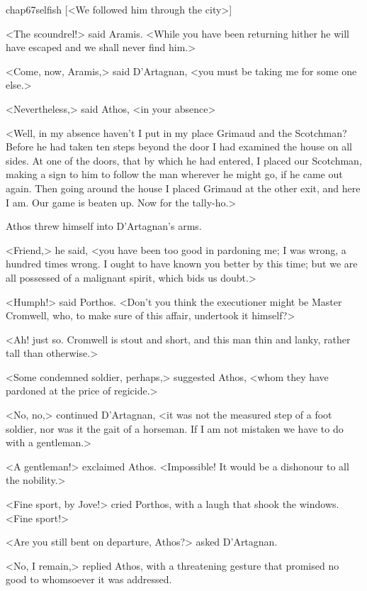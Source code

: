 \begin{bwbigpic}
	[\basicscale] 
	{chap67selfish}
	[<We followed him through the city>]
\end{bwbigpic}

<The scoundrel!> said Aramis. <While you have been returning hither he will have escaped and we shall never find him.>

<Come, now, Aramis,> said D'Artagnan, <you must be taking me for some one else.>

<Nevertheless,> said Athos, <in your absence\longdash>

<Well, in my absence haven't I put in my place Grimaud and the Scotchman? Before he had taken ten steps beyond the door I had examined the house on all sides. At one of the doors, that by which he had entered, I placed our Scotchman, making a sign to him to follow the man wherever he might go, if he came out again. Then going around the house I placed Grimaud at the other exit, and here I am. Our game is beaten up. Now for the tally-ho.>

Athos threw himself into D'Artagnan's arms.

<Friend,> he said, <you have been too good in pardoning me; I was wrong, a hundred times wrong. I ought to have known you better by this time; but we are all possessed of a malignant spirit, which bids us doubt.>

<Humph!> said Porthos. <Don't you think the executioner might be Master Cromwell, who, to make sure of this affair, undertook it himself?>

<Ah! just so. Cromwell is stout and short, and this man thin and lanky, rather tall than otherwise.>

<Some condemned soldier, perhaps,> suggested Athos, <whom they have pardoned at the price of regicide.>

<No, no,> continued D'Artagnan, <it was not the measured step of a foot soldier, nor was it the gait of a horseman. If I am not mistaken we have to do with a gentleman.>

<A gentleman!> exclaimed Athos. <Impossible! It would be a dishonour to all the nobility.>

<Fine sport, by Jove!> cried Porthos, with a laugh that shook the windows. <Fine sport!>

<Are you still bent on departure, Athos?> asked D'Artagnan.

<No, I remain,> replied Athos, with a threatening gesture that promised no good to whomsoever it was addressed.

